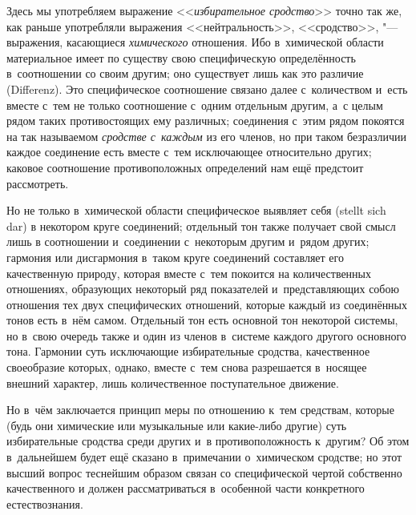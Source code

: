 
Здесь мы употребляем выражение <<{\em избирательное сродство}>> точно так же,
как раньше употребляли выражения <<нейтральность>>, <<сродство>>, "---
выражения, касающиеся {\em химического} отношения. Ибо в~химической области
материальное имеет по существу свою специфическую определённость в~соотношении
со своим другим; оно существует лишь как это различие (Diffe\-renz). Это
специфическое соотношение связано далее с~количеством и~есть вместе с~тем не
только соотношение с~одним отдельным другим, а~с целым рядом таких
противостоящих ему различных; соединения с~этим рядом покоятся на так
называемом {\em сродстве с~каждым} из его членов, но при таком безразличии
каждое соединение есть вместе с~тем исключающее относительно других; каковое
соотношение противоположных определений нам ещё предстоит рассмотреть.

Но не только в~химической области специфическое выявляет себя (stellt sich dar)
в некотором круге соединений; отдельный тон также получает свой смысл лишь в
соотношении и~соединении с~некоторым другим и~рядом других; гармония или
дисгармония в~таком круге соединений составляет его качественную природу,
которая вместе с~тем покоится на количественных отношениях, образующих
некоторый ряд показателей и~представляющих собою отношения тех двух
специфических отношений, которые каждый из соединённых тонов есть в~нём самом.
Отдельный тон есть основной тон некоторой системы, но в~свою очередь также и
один из членов в~системе каждого другого основного тона. Гармонии суть
исключающие избирательные сродства, качественное своеобразие которых, однако,
вместе с~тем снова разрешается в~носящее внешний характер, лишь количественное
поступательное движение.

Но в~чём заключается принцип меры по отношению к~тем средствам, которые (будь
они химические или музыкальные или какие-либо другие) суть избирательные
сродства среди других и~в противоположность к~другим? Об этом в~дальнейшем
будет ещё сказано в~примечании о~химическом сродстве; но этот высший вопрос
теснейшим образом связан со специфической чертой собственно качественного и
должен рассматриваться в~особенной части конкретного естествознания.

